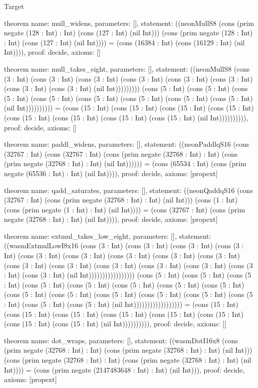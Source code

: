 \begin{lexlean}{Target}
\begin{semanticmodule}
theorem{
  name: mull_widens,
  parameters: [],
  statement: ((neonMullS8 (cons (prim negate (128 : Int) : Int) (cons (127 : Int) (nil Int))) (cons (prim negate (128 : Int) : Int) (cons (127 : Int) (nil Int)))) = (cons (16384 : Int) (cons (16129 : Int) (nil Int)))),
  proof: decide{},
  axioms: []
}

theorem{
  name: mull_takes_eight,
  parameters: [],
  statement: ((neonMullS8 (cons (3 : Int) (cons (3 : Int) (cons (3 : Int) (cons (3 : Int) (cons (3 : Int) (cons (3 : Int) (cons (3 : Int) (cons (3 : Int) (nil Int))))))))) (cons (5 : Int) (cons (5 : Int) (cons (5 : Int) (cons (5 : Int) (cons (5 : Int) (cons (5 : Int) (cons (5 : Int) (cons (5 : Int) (nil Int)))))))))) = (cons (15 : Int) (cons (15 : Int) (cons (15 : Int) (cons (15 : Int) (cons (15 : Int) (cons (15 : Int) (cons (15 : Int) (cons (15 : Int) (nil Int)))))))))),
  proof: decide{},
  axioms: []
}

theorem{
  name: paddl_widens,
  parameters: [],
  statement: ((neonPaddlqS16 (cons (32767 : Int) (cons (32767 : Int) (cons (prim negate (32768 : Int) : Int) (cons (prim negate (32768 : Int) : Int) (nil Int)))))) = (cons (65534 : Int) (cons (prim negate (65536 : Int) : Int) (nil Int)))),
  proof: decide{},
  axioms: [propext]
}

theorem{
  name: qadd_saturates,
  parameters: [],
  statement: ((neonQaddqS16 (cons (32767 : Int) (cons (prim negate (32768 : Int) : Int) (nil Int))) (cons (1 : Int) (cons (prim negate (1 : Int) : Int) (nil Int)))) = (cons (32767 : Int) (cons (prim negate (32768 : Int) : Int) (nil Int)))),
  proof: decide{},
  axioms: [propext]
}

theorem{
  name: extmul_takes_low_eight,
  parameters: [],
  statement: ((wasmExtmulLowI8x16 (cons (3 : Int) (cons (3 : Int) (cons (3 : Int) (cons (3 : Int) (cons (3 : Int) (cons (3 : Int) (cons (3 : Int) (cons (3 : Int) (cons (3 : Int) (cons (3 : Int) (cons (3 : Int) (cons (3 : Int) (cons (3 : Int) (cons (3 : Int) (cons (3 : Int) (cons (3 : Int) (nil Int))))))))))))))))) (cons (5 : Int) (cons (5 : Int) (cons (5 : Int) (cons (5 : Int) (cons (5 : Int) (cons (5 : Int) (cons (5 : Int) (cons (5 : Int) (cons (5 : Int) (cons (5 : Int) (cons (5 : Int) (cons (5 : Int) (cons (5 : Int) (cons (5 : Int) (cons (5 : Int) (cons (5 : Int) (nil Int)))))))))))))))))) = (cons (15 : Int) (cons (15 : Int) (cons (15 : Int) (cons (15 : Int) (cons (15 : Int) (cons (15 : Int) (cons (15 : Int) (cons (15 : Int) (nil Int)))))))))),
  proof: decide{},
  axioms: []
}

theorem{
  name: dot_wraps,
  parameters: [],
  statement: ((wasmDotI16x8 (cons (prim negate (32768 : Int) : Int) (cons (prim negate (32768 : Int) : Int) (nil Int))) (cons (prim negate (32768 : Int) : Int) (cons (prim negate (32768 : Int) : Int) (nil Int)))) = (cons (prim negate (2147483648 : Int) : Int) (nil Int))),
  proof: decide{},
  axioms: [propext]
}


\end{semanticmodule}
\end{lexlean}
